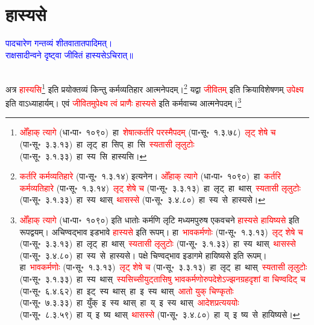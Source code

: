 \section[हास्यसे]{हास्यसे}
\centering\textcolor{blue}{पादचारेण गन्तव्यं शीतवातातपादिमत्।\nopagebreak\\
राक्षसादीन्वने दृष्ट्वा जीवितं हास्यसेऽचिरात्॥}\nopagebreak\\
\\
\fontsize{14}{21}\selectfont\begin{sloppypar}\justifying\noindent\hspace{10mm} अत्र \textcolor{red}{हास्यसि}\footnote{\textcolor{red}{ओँहाक् त्यागे} (धा॰पा॰~१०९०)~\arrow हा~\arrow \textcolor{red}{शेषात्कर्तरि परस्मैपदम्} (पा॰सू॰~१.३.७८)~\arrow \textcolor{red}{लृट् शेषे च} (पा॰सू॰~३.३.१३)~\arrow हा~लृट्~\arrow हा~सिप्~\arrow हा~सि~\arrow \textcolor{red}{स्यतासी लृलुटोः} (पा॰सू॰~३.१.३३)~\arrow हा~स्य~सि~\arrow हास्यसि।} इति प्रयोक्तव्यं किन्तु कर्म\-व्यतिहार आत्मनेपदम्।\footnote{\textcolor{red}{कर्तरि कर्मव्यतिहारे} (पा॰सू॰~१.३.१४) इत्यनेन। \textcolor{red}{ओँहाक् त्यागे} (धा॰पा॰~१०९०)~\arrow हा~\arrow \textcolor{red}{कर्तरि कर्मव्यतिहारे} (पा॰सू॰~१.३.१४)~\arrow \textcolor{red}{लृट् शेषे च} (पा॰सू॰~३.३.१३)~\arrow हा~लृट्~\arrow हा~थास्~\arrow \textcolor{red}{स्यतासी लृलुटोः} (पा॰सू॰~३.१.३३)~\arrow हा~स्य~थास्~\arrow \textcolor{red}{थासस्से} (पा॰सू॰~३.४.८०)~\arrow हा~स्य~से~\arrow हास्यसे।} यद्वा \textcolor{red}{जीवितम्} इति क्रिया\-विशेषणम् \textcolor{red}{उपेक्ष्य} इति वाऽध्याहार्यम्। एवं \textcolor{red}{जीवितमुपेक्ष्य त्वं प्राणैः हास्यसे} इति कर्म\-वाच्य आत्मनेपदम्।\footnote{\textcolor{red}{ओँहाक् त्यागे} (धा॰पा॰~१०९०) इति धातोः कर्मणि लृटि मध्यम\-पुरुष एकवचने \textcolor{red}{हास्यसे हायिष्यसे} इति रूपद्वयम्। अचिण्वद्भाव इडभावे \textcolor{red}{हास्यसे} इति रूपम्। हा~\arrow \textcolor{red}{भावकर्मणोः} (पा॰सू॰~१.३.१३)~\arrow \textcolor{red}{लृट् शेषे च} (पा॰सू॰~३.३.१३)~\arrow हा~लृट्~\arrow हा~थास्~\arrow \textcolor{red}{स्यतासी लृलुटोः} (पा॰सू॰~३.१.३३)~\arrow हा~स्य~थास्~\arrow \textcolor{red}{थासस्से} (पा॰सू॰~३.४.८०)~\arrow हा~स्य~से~\arrow हास्यसे। पक्षे चिण्वद्भाव इडागमे हायिष्यसे इति रूपम्। हा~\arrow \textcolor{red}{भावकर्मणोः} (पा॰सू॰~१.३.१३)~\arrow \textcolor{red}{लृट् शेषे च} (पा॰सू॰~३.३.१३)~\arrow हा~लृट्~\arrow हा~थास्~\arrow \textcolor{red}{स्यतासी लृलुटोः} (पा॰सू॰~३.१.३३)~\arrow हा~स्य~थास्~\arrow \textcolor{red}{स्यसिच्सीयुट्तासिषु भाव\-कर्मणोरुपदेशेऽज्झन\-ग्रहदृशां वा चिण्वदिट् च} (पा॰सू॰~६.४.६२)~\arrow हा~इट्~स्य~थास्~\arrow हा~इ~स्य~थास्~\arrow \textcolor{red}{आतो युक् चिण्कृतोः} (पा॰सू॰~७.३.३३)~\arrow हा~युँक्~इ~स्य~थास्~\arrow हा~य्~इ~स्य~थास्~\arrow \textcolor{red}{आदेश\-प्रत्यययोः} (पा॰सू॰~८.३.५९)~\arrow हा~य्~इ~ष्य~थास्~\arrow \textcolor{red}{थासस्से} (पा॰सू॰~३.४.८०)~\arrow हा~य्~इ~ष्य~से~\arrow हायिष्यसे।}\end{sloppypar}
